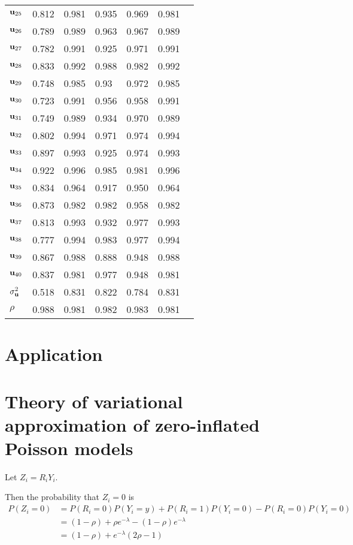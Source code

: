 \documentclass{article}[12pt]
\begin{document}
\begin{table}
\begin{tabular}{l|llllll}
${\bf u}_{25}$     &0.812&0.981&0.935&0.969&0.981\\
${\bf u}_{26}$     &0.789&0.989&0.963&0.967&0.989\\
${\bf u}_{27}$     &0.782&0.991&0.925&0.971&0.991\\
${\bf u}_{28}$     &0.833&0.992&0.988&0.982&0.992\\
${\bf u}_{29}$     &0.748&0.985&0.93&0.972&0.985\\
${\bf u}_{30}$     &0.723&0.991&0.956&0.958&0.991\\
${\bf u}_{31}$     &0.749&0.989&0.934&0.970&0.989\\
${\bf u}_{32}$     &0.802&0.994&0.971&0.974&0.994\\
${\bf u}_{33}$     &0.897&0.993&0.925&0.974&0.993\\
${\bf u}_{34}$     &0.922&0.996&0.985&0.981&0.996\\
${\bf u}_{35}$     &0.834&0.964&0.917&0.950&0.964\\
${\bf u}_{36}$     &0.873&0.982&0.982&0.958&0.982\\
${\bf u}_{37}$     &0.813&0.993&0.932&0.977&0.993\\
${\bf u}_{38}$     &0.777&0.994&0.983&0.977&0.994\\
${\bf u}_{39}$     &0.867&0.988&0.888&0.948&0.988\\
${\bf u}_{40}$     &0.837&0.981&0.977&0.948&0.981\\
$\sigma^2_{\bf u}$ &0.518&0.831&0.822&0.784&0.831\\
$\rho$ &0.988&0.981&0.982&0.983&0.981\\
\hline
\end{tabular}
\end{table}



\section{Application}\label{sec:application}

\section{Theory of variational approximation of zero-inflated Poisson models}
Let $Z_i = R_i Y_i$.

\noindent Then the probability that $Z_i = 0$ is
$$
\begin{array}{rl}
P(Z_i = 0) &= P(R_i = 0)P(Y_i = y) + P(R_i = 1) P(Y_i = 0) - P(R_i = 0) P(Y_i = 0) \\
&= (1 - \rho) + \rho e^{-\lambda} - (1 - \rho) e^{-\lambda} \\
&= (1 - \rho) + e^{-\lambda}(2 \rho - 1)
\end{array}
$$
\end{document}
